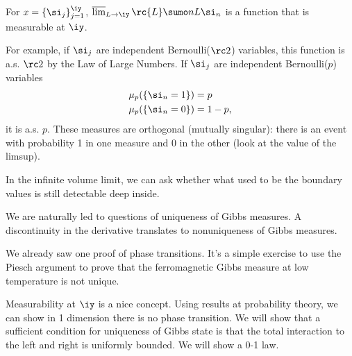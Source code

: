\begin{ex}
For $x=\{\si_j\}_{j=1}^{\iy}$, $\varlimsup_{L\to \iy} \rc{L} \sumo nL \si_n$ is a function that is measurable at $\iy$.

For example, if $\si_j$ are independent Bernoulli($\rc2$) variables, this function is a.s. $\rc2$ by the Law of Large Numbers. If $\si_j$ are independent Bernoulli($p$) variables
\begin{align*}
\mu_p(\{\si_n=1\}) &= p\\
\mu_p(\{\si_n=0\}) &=1-p,
\end{align*}
it is a.s. $p$.
These measures are orthogonal (mutually singular): there is an event with probability 1 in one measure and 0 in the other (look at the value of the limsup).
\end{ex}

In the infinite volume limit, we can ask whether what used to be the boundary values is still detectable deep inside.

We are naturally led to questions of uniqueness of Gibbs measures. A discontinuity in the derivative translates to nonuniqueness of Gibbs measures.

We already saw one proof of phase transitions. It's a simple exercise to use the Piesch argument to prove that the ferromagnetic Gibbs measure at low temperature is not unique.

Measurability at $\iy$ is a nice concept. Using results at probability theory, we can show in 1 dimension there is no phase transition. We will show that a sufficient condition for uniqueness of Gibbs state is that the total interaction to the left and right is uniformly bounded. We will show a 0-1 law.



